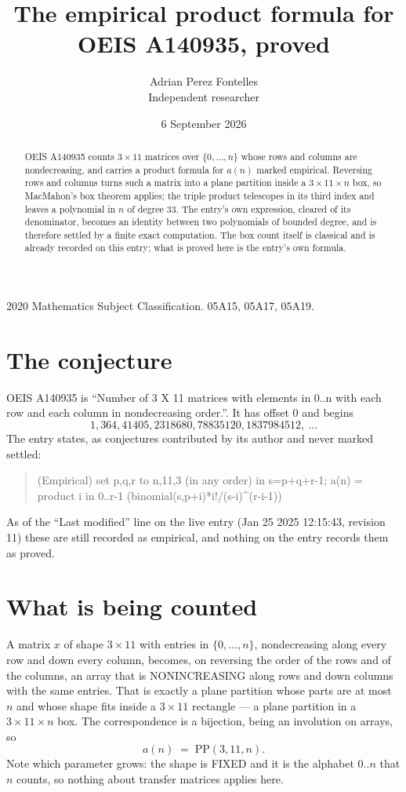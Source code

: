 \documentclass[11pt,a4paper]{article}
\title{The empirical product formula for OEIS A140935, proved}
\author{Adrian Perez Fontelles\\ \small Independent researcher}
\date{6 September 2026}
\theoremstyle{plain}
\theoremstyle{definition}
\begin{document}
\maketitle

\begin{abstract}
OEIS A140935 counts $3\times11$ matrices over $\{0,\dots,n\}$ whose rows and columns are
nondecreasing, and carries a product formula for $a(n)$ marked empirical. Reversing rows and
columns turns such a matrix into a plane partition inside a $3\times11\times n$ box, so
MacMahon's box theorem applies; the triple product telescopes in its third index and leaves a
polynomial in $n$ of degree $33$. The entry's own expression, cleared of its denominator,
becomes an identity between two polynomials of bounded degree, and is therefore settled by a
finite exact computation. The box count itself is classical and is already recorded on this
entry; what is proved here is the entry's own formula.
\end{abstract}

\noindent\small 2020 Mathematics Subject Classification. 05A15, 05A17, 05A19.\normalsize

\section{The conjecture}

OEIS A140935 is ``Number of 3 X 11 matrices with elements in 0..n with each row and each column in nondecreasing order.''. It has offset $0$ and begins
\[
1, 364, 41405, 2318680, 78835120, 1837984512,\ \dots
\]
The entry states, as conjectures contributed by its author and never marked settled:
\begin{quote}
(Empirical) set p,q,r to n,11,3 (in any order) in s=p+q+r-1; a(n) = product {i in 0..r-1} (binomial(s,p+i)*i!/(s-i)\^{}(r-i-1))

\end{quote}
As of the ``Last modified'' line on the live entry (Jan 25 2025 12:15:43, revision 11) these are still
recorded as empirical, and nothing on the entry records them as proved.

\section{What is being counted}

A matrix $x$ of shape $3\times11$ with entries in $\{0,\dots,n\}$, nondecreasing along
every row and down every column, becomes, on reversing the order of the rows and of the
columns, an array that is NONINCREASING along rows and down columns with the same entries. That
is exactly a plane partition whose parts are at most $n$ and whose shape fits inside a
$3\times11$ rectangle --- a plane partition in a $3\times11\times n$ box. The
correspondence is a bijection, being an involution on arrays, so
\[
a(n)\;=\;\mathrm{PP}(3,11,n).
\]
Note which parameter grows: the shape is FIXED and it is the alphabet $0..n$ that $n$ counts,
so nothing about transfer matrices applies here.
\end{document}
